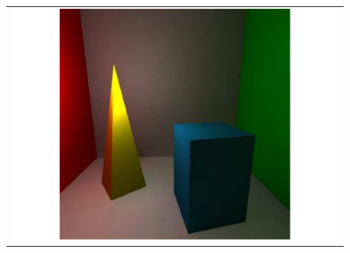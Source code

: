 \begin{figure}
\begin{center}
{\begin{tabular}{c}
\includegraphics*[scale=0.2]{imgs/pq_frame3.pdf}
\end{tabular}
}%
\end{center}
\end{figure}
